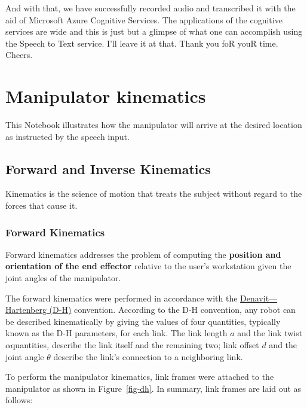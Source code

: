 \documentclass[
  letterpaper,
  DIV=11,
  numbers=noendperiod]{scrreprt}
\begin{document}
And with that, we have successfully recorded audio and transcribed it
with the aid of Microsoft Azure Cognitive Services. The applications of
the cognitive services are wide and this is just but a glimpse of what
one can accomplish using the Speech to Text service. I'll leave it at
that. Thank you foR youR time. Cheers.

\hypertarget{manipulator-kinematics}{%
\chapter{Manipulator kinematics}\label{manipulator-kinematics}}

This Notebook illustrates how the manipulator will arrive at the desired
location as instructed by the speech input.

\hypertarget{forward-and-inverse-kinematics}{%
\section{Forward and Inverse
Kinematics}\label{forward-and-inverse-kinematics}}

Kinematics is the science of motion that treats the subject without
regard to the forces that cause it.

\hypertarget{forward-kinematics}{%
\subsection{Forward Kinematics}\label{forward-kinematics}}

Forward kinematics addresses the problem of computing the
\textbf{position and orientation of the end effector} relative to the
user's workstation given the joint angles of the manipulator.

The forward kinematics were performed in accordance with the
\href{https://en.wikipedia.org/wiki/Denavit\%E2\%80\%93Hartenberg_parameters}{Denavit---Hartenberg
(D-H)} convention. According to the D-H convention, any robot can be
described kinematically by giving the values of four quantities,
typically known as the D-H parameters, for each link. The link length
\(a\) and the link twist \(\alpha\)quantities\emph{,} describe the link
itself and the remaining two; link offset \(d\) and the joint angle
\(\theta\) describe the link's connection to a neighboring link.

To perform the manipulator kinematics, link frames were attached to the
manipulator as shown in Figure~\ref{fig-dh}. In summary, link frames are
laid out as follows:
\end{document}
